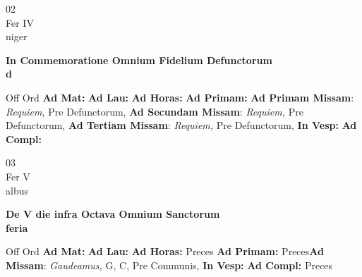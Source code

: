 \documentclass[10pt, openany]{book}
\begin{document}
    \begin{center}
        \begin{minipage}{3.5in}
            \vspace{2em}
            \begin{minipage}{0.5in}
                {\Huge 02} \\
                {\normalsize Fer IV} \\
                {\normalsize niger}
            \end{minipage}
            \begin{minipage}{3.0in}
                \textbf{ \large In Commemoratione Omnium Fidelium Defunctorum \\
                \textnormal{\normalsize d}} \\ 
            \end{minipage}
            \begin{justify}Off Ord
                \textbf{Ad Mat: }
                \textbf{Ad Lau: }
                \textbf{Ad Horas: }
                \textbf{Ad Primam: }\textbf{Ad Primam Missam}: \textit{Requiem,} Pre Defunctorum,  \textbf{Ad Secundam Missam}: \textit{Requiem,} Pre Defunctorum,  \textbf{Ad Tertiam Missam}: \textit{Requiem,} Pre Defunctorum,  
                \textbf{In Vesp: }
                \textbf{Ad Compl: }
            \end{justify}
        \end{minipage}
    \end{center}

    \begin{center}
        \begin{minipage}{3.5in}
            \vspace{2em}
            \begin{minipage}{0.5in}
                {\Huge 03} \\
                {\normalsize Fer V} \\
                {\normalsize albus}
            \end{minipage}
            \begin{minipage}{3.0in}
                \textbf{ \large De V die infra Octava Omnium Sanctorum \\
                \textnormal{\normalsize feria}} \\ 
            \end{minipage}
            \begin{justify}Off Ord
                \textbf{Ad Mat: }
                \textbf{Ad Lau: }
                \textbf{Ad Horas: }Preces
                \textbf{Ad Primam: }Preces\textbf{Ad Missam}: \textit{Gaudeamus,} G, C, Pre Communis,  
                \textbf{In Vesp: }
                \textbf{Ad Compl: }Preces
            \end{justify}
        \end{minipage}
    \end{center}
\end{document}
